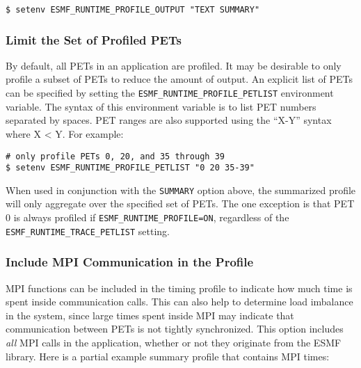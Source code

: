 \begin{verbatim}
$ setenv ESMF_RUNTIME_PROFILE_OUTPUT "TEXT SUMMARY"
\end{verbatim}


\subsubsection{Limit the Set of Profiled PETs}
\label{sec:LimitProfiling}

By default, all PETs in an application are profiled. It may be desirable
to only profile a subset of PETs to reduce the amount of output.
An explicit list of PETs can be specified by setting the
{\tt ESMF\_RUNTIME\_PROFILE\_PETLIST} environment variable.
The syntax of this environment variable is to list
PET numbers separated by spaces. PET ranges are also supported using
the ``X-Y'' syntax where X < Y.
For example:

\begin{verbatim}
# only profile PETs 0, 20, and 35 through 39
$ setenv ESMF_RUNTIME_PROFILE_PETLIST "0 20 35-39"
\end{verbatim}

When used in conjunction with the {\tt SUMMARY} option above, the summarized
profile will only aggregate over the specified set of PETs. The one exception is that
PET 0 is always profiled if {\tt ESMF\_RUNTIME\_PROFILE=ON}, regardless of the
{\tt ESMF\_RUNTIME\_TRACE\_PETLIST} setting.


\subsubsection{Include MPI Communication in the Profile}
\label{sec:MPIProfiling}

MPI functions can be included in the timing profile to indicate how much time
is spent inside communication calls.  This can also help to determine load imbalance
in the system, since large times spent inside MPI may indicate that communication
between PETs is not tightly synchronized.  This option includes {\em all} MPI calls in
the application, whether or not they originate from the ESMF library.  Here is a partial
example summary profile that contains MPI times:

